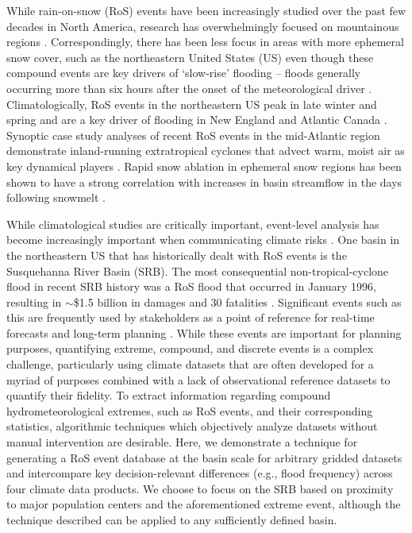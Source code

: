 \documentclass[draft]{agujournal2019}
\begin{document}
While rain-on-snow (RoS) events have been increasingly studied over the past few decades in North America, research has overwhelmingly focused on mountainous regions \citep{singh1997hydrological,mccabe2007rain,musselman2018projected}. 
Correspondingly, there has been less focus in areas with more ephemeral snow cover, such as the northeastern United States (US) even though these compound events are key drivers of `slow-rise' flooding -- floods generally occurring more than six hours after the onset of the meteorological driver \citep{dougherty2021high}. 
Climatologically, RoS events in the northeastern US peak in late winter and spring \citep{ashley2008flood,villarini2010flood,dougherty2019climatology,wachowicz2020rain} and are a key driver of flooding in New England and Atlantic Canada \citep{collins2014annual}. 
Synoptic case study analyses of recent RoS events in the mid-Atlantic region demonstrate inland-running extratropical cyclones that advect warm, moist air as key dynamical players \citep{grote2021synoptic}. 
Rapid snow ablation in ephemeral snow regions has been shown to have a strong correlation with increases in basin streamflow in the days following snowmelt \citep{suriano2020discharge}.

While climatological studies are critically important, event-level analysis has become increasingly important when communicating climate risks \citep{shepherd2018storylines}. 
One basin in the northeastern US that has historically dealt with RoS events is the Susquehanna River Basin (SRB). The most consequential non-tropical-cyclone flood in recent SRB history was a RoS flood that occurred in January 1996, resulting in $\sim$\$1.5 billion in damages and 30 fatalities \citep{leathers1998severe}.
Significant events such as this are frequently used by stakeholders as a point of reference for real-time forecasts and long-term planning \citep{george2019the}. 
While these events are important for planning purposes, quantifying extreme, compound, and discrete events is a complex challenge, particularly using climate datasets that are often developed for a myriad of purposes combined with a lack of observational reference datasets to quantify their fidelity. 
To extract information regarding compound hydrometeorological extremes, such as RoS events, and their corresponding statistics, algorithmic techniques which objectively analyze datasets without manual intervention are desirable.
Here, we demonstrate a technique for generating a RoS event database at the basin scale for arbitrary gridded datasets and intercompare key decision-relevant differences (e.g., flood frequency) across four climate data products. We choose to focus on the SRB based on proximity to major population centers and the aforementioned extreme event, although the technique described can be applied to any sufficiently defined basin.
\end{document}
